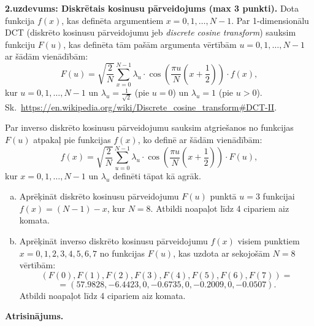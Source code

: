 \documentclass[11pt]{article}
\begin{document}
\vspace{10pt}
{\footnotesize
{\bf 2.uzdevums: Diskrētais kosinusu pārveidojums (max 3 punkti).}
Dota funkcija $f(x)$, kas definēta argumentiem $x=0,1,\ldots,N-1$. 
Par 1-dimensionālu DCT (diskrēto kosinusu pārveidojumu jeb {\em discrete cosine transform}) sauksim 
funkciju $F(u)$, kas definēta tām pašām argumenta vērtībām $u=0,1,\ldots,N-1$ 
ar šādām vienādībām: 
$$F(u) = \sqrt{\frac{2}{N}} \sum\limits_{x=0}^{N-1} \lambda_u \cdot \cos \left( \frac{\pi u}{N}\left(  x+\frac{1}{2} \right) \right) \cdot f(x),$$
kur $u=0,1,\ldots,N-1$ un $\lambda_u = \frac{1}{\sqrt{2}}$ (pie $u=0$) un $\lambda_u = 1$ (pie $u>0$).\\
Sk.\ \url{https://en.wikipedia.org/wiki/Discrete_cosine_transform#DCT-II}.

Par inverso diskrēto kosinusu pārveidojumu sauksim atgriešanos no funkcijas $F(u)$ atpakaļ pie funkcijas $f(x)$, 
ko definē ar šādām vienādībām:
$$f(x) = \sqrt{\frac{2}{N}} \sum\limits_{u=0}^{N-1} \lambda_u \cdot \cos \left( \frac{\pi u}{N}\left(  x+\frac{1}{2} \right) \right) \cdot F(u),$$
kur $x=0,1,\ldots,N-1$ un $\lambda_u$ definēti tāpat kā agrāk.
\begin{enumerate}[(a)]
\item 
Aprēķināt diskrēto kosinusu pārveidojumu $F(u)$ punktā $u=3$
funkcijai\\ $f(x) = (N-1)-x$, kur $N=8$. 
Atbildi noapaļot līdz 4 cipariem aiz komata.
\item 
Aprēķināt inverso diskrēto kosinusu pārveidojumu $f(x)$ visiem 
punktiem $x=0,1,2,3,4,5,6,7$ no funkcijas $F(u)$, kas uzdota ar
sekojošām $N=8$ vērtībām:
$$(F(0),F(1),F(2),F(3),F(4),F(5),F(6),F(7)) =$$
$$ = (57.9828,-6.4423,0,-0.6735,0,-0.2009,0,-0.0507).$$
Atbildi noapaļot līdz 4 cipariem aiz komata.
\end{enumerate}
}



\vspace{6pt}
{\bf Atrisinājums.} 
\end{document}
